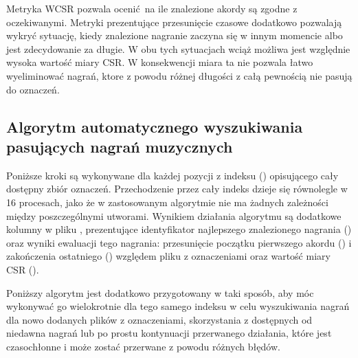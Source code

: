 Metryka WCSR pozwala ocenić na ile znalezione akordy są zgodne z oczekiwanymi. Metryki prezentujące
przesunięcie czasowe dodatkowo pozwalają wykryć sytuację, kiedy znalezione nagranie zaczyna się w
innym momencie albo jest zdecydowanie za długie. W obu tych sytuacjach wciąż możliwa jest względnie
wysoka wartość miary CSR. W konsekwencji miara ta nie pozwala łatwo wyeliminować nagrań, ktore z
powodu różnej długości z całą pewnością nie pasują do oznaczeń.

\subsection{Algorytm automatycznego wyszukiwania pasujących nagrań muzycznych}
Poniższe kroki są wykonywane dla każdej pozycji z indeksu () opisującego cały
dostępny zbiór oznaczeń. Przechodzenie przez cały indeks dzieje się równolegle w 16 procesach, jako
że w zastosowanym algorytmie nie ma żadnych zależności między poszczególnymi utworami. Wynikiem
działania algorytmu są dodatkowe kolumny w pliku , prezentujące identyfikator
najlepszego znalezionego nagrania () oraz wyniki ewaluacji tego nagrania:
przesunięcie początku pierwszego akordu () i zakończenia ostatniego
() względem pliku z oznaczeniami oraz wartość miary CSR ().

Poniższy algorytm jest dodatkowo przygotowany w taki sposób, aby móc wykonywać go wielokrotnie dla
tego samego indeksu w celu wyszukiwania nagrań dla nowo dodanych plików z oznaczeniami, skorzystania
z dostępnych od niedawna nagrań lub po prostu kontynuacji przerwanego działania, które jest
czasochłonne i może zostać przerwane z powodu różnych błędów.


